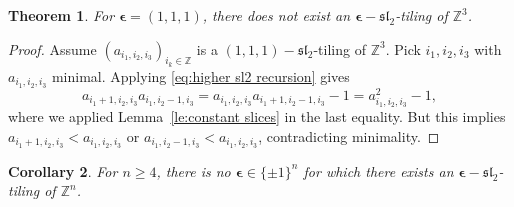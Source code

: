 \documentclass{amsart}
\newtheorem{theorem}{Theorem}
\newtheorem{corollary}[theorem]{Corollary}
\newcommand{\bepsilon}{\boldsymbol{\epsilon}}
\newcommand{\fsl}{\mathfrak{sl}}
\newcommand{\ZZ}{\mathbb{Z}}
\begin{document}
    \begin{theorem}
      For $\bepsilon=(1,1,1)$, there does not exist an $\bepsilon-\fsl_2$-tiling of $\ZZ^3$.
    \end{theorem}
    \begin{proof}
      Assume $(a_{i_1,i_2,i_3})_{i_k\in\ZZ}$ is a $(1,1,1)-\fsl_2$-tiling of $\ZZ^3$.  Pick $i_1,i_2,i_3$ with $a_{i_1,i_2,i_3}$ minimal.  Applying \eqref{eq:higher sl2 recursion} gives
      \[a_{i_1+1,i_2,i_3}a_{i_1,i_2-1,i_3}=a_{i_1,i_2,i_3}a_{i_1+1,i_2-1,i_3}-1=a_{i_1,i_2,i_3}^2-1,\]
      where we applied Lemma~\ref{le:constant slices} in the last equality.  But this implies $a_{i_1+1,i_2,i_3}<a_{i_1,i_2,i_3}$ or $a_{i_1,i_2-1,i_3}<a_{i_1,i_2,i_3}$, contradicting minimality.
    \end{proof}

    \begin{corollary}
      For $n\ge4$, there is no $\bepsilon\in\{\pm1\}^n$ for which there exists an $\bepsilon-\fsl_2$-tiling of $\ZZ^n$.
    \end{corollary}
  
\end{document}
